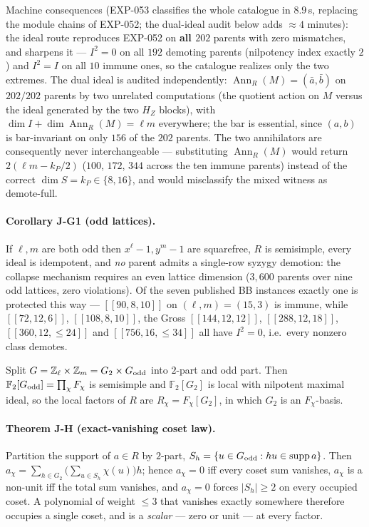 \documentclass[11pt]{article}
\newcommand{\nk}[1]{[\![#1]\!]}
\theoremstyle{plain}
\theoremstyle{remark}
\begin{document}
Machine consequences (EXP-053 classifies the whole catalogue in $8.9$\,s,
replacing the module chains of EXP-052; the dual-ideal audit below adds
$\approx4$ minutes): the ideal route reproduces EXP-052 on \textbf{all
$202$} parents with zero mismatches, and sharpens it --- $I^2=0$ on all $192$
demoting parents (nilpotency index exactly $2$) and $I^2=I$ on all $10$ immune
ones, so the catalogue realizes only the two extremes. The dual ideal is
audited independently: $\operatorname{Ann}_R(M)=(\bar a,\bar b)$ on $202/202$
parents by two unrelated computations (the quotient action on $M$ versus the
ideal generated by the two $H_Z$ blocks), with
$\dim I+\dim\operatorname{Ann}_R(M)=\ell m$ everywhere; the bar is essential,
since $(a,b)$ is bar-invariant on only $156$ of the $202$ parents. The two
annihilators are consequently never interchangeable --- substituting
$\operatorname{Ann}_R(M)$ would return $2(\ell m-k_P/2)$ ($100$, $172$, $344$
across the ten immune parents) instead of the correct $\dim S=k_P\in\{8,16\}$,
and would misclassify the mixed witness as demote-full.

\paragraph{Corollary J-G1 (odd lattices).} If $\ell,m$ are both odd then
$x^\ell-1,y^m-1$ are squarefree, $R$ is semisimple, every ideal is idempotent,
and \emph{no} parent admits a single-row syzygy demotion: the collapse mechanism
requires an even lattice dimension ($3{,}600$ parents over nine odd lattices,
zero violations). Of the seven published BB instances exactly one is protected
this way --- $\nk{90,8,10}$ on $(\ell,m)=(15,3)$ is immune, while
$\nk{72,12,6}$, $\nk{108,8,10}$, the Gross $\nk{144,12,12}$, $\nk{288,12,18}$,
$[[360,12,{\le}24]]$ and $[[756,16,{\le}34]]$ all have $I^2=0$, i.e.\ every
nonzero class demotes.

Split $G=\mathbb Z_\ell\times\mathbb Z_m=G_2\times G_{\rm odd}$ into $2$-part
and odd part. Then $\mathbb F_2[G_{\rm odd}]=\prod_\chi F_\chi$ is semisimple
and $\mathbb F_2[G_2]$ is local with nilpotent maximal ideal, so the local
factors of $R$ are $R_\chi=F_\chi[G_2]$, in which $G_2$ is an $F_\chi$-basis.

\paragraph{Theorem J-H (exact-vanishing coset law).} Partition the support of
$a\in R$ by $2$-part, $S_h=\{u\in G_{\rm odd}:hu\in\operatorname{supp}a\}$.
Then $a_\chi=\sum_{h\in G_2}\bigl(\sum_{u\in S_h}\chi(u)\bigr)h$; hence
$a_\chi=0$ iff every coset sum vanishes, $a_\chi$ is a non-unit iff the total
sum vanishes, and $a_\chi=0$ forces $|S_h|\ge2$ on every occupied coset. A
polynomial of weight $\le3$ that vanishes exactly somewhere therefore occupies a
single coset, and is a \emph{scalar} --- zero or unit --- at every factor.
\end{document}
